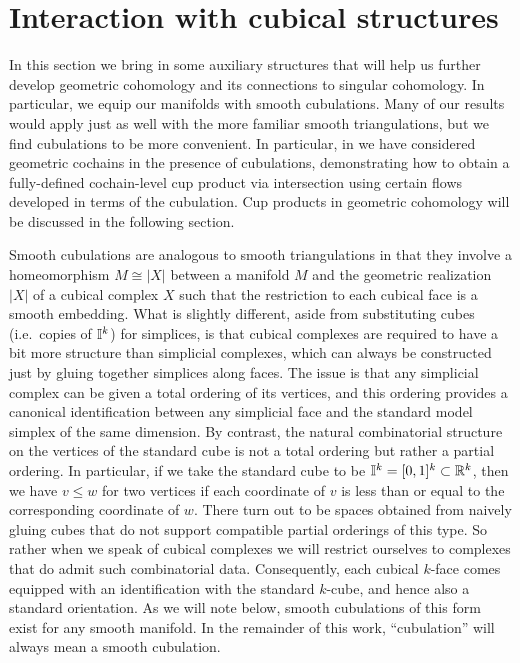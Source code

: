 







\section{Interaction with cubical structures}
\label{S: transversality}

In this section we bring in some auxiliary structures that will help us further develop geometric cohomology and its connections to singular cohomology. In particular, we equip our manifolds with smooth cubulations. Many of our results would apply just as well with the more familiar smooth triangulations, but we find cubulations to be more convenient. In particular, in \cite{FMS-flows} we have considered geometric cochains in the presence of cubulations, demonstrating how to obtain a fully-defined cochain-level cup product via intersection using certain flows developed in terms of the cubulation. Cup products in geometric cohomology will be discussed in the following section.

Smooth cubulations are analogous to smooth triangulations in that they involve a homeomorphism $M\cong |X|$ between a manifold $M$ and the geometric realization $|X|$ of a cubical complex $X$ such that the restriction to each cubical face is a smooth embedding. What is slightly different, aside from substituting cubes (i.e.\ copies of $\mathbb{I}^k$) for simplices, is that cubical complexes are required to have a bit more structure than simplicial complexes, which can always be constructed just by gluing together simplices along faces. The issue is that any simplicial complex can be given a total ordering of its vertices, and this ordering provides a canonical identification between any simplicial face and the standard model simplex of the same dimension. By contrast, the natural combinatorial structure on the vertices of the standard cube is not a total ordering but rather a partial ordering. In particular, if we take the standard cube to be $\mathbb{I}^k=[0,1]^k\subset \mathbb{R}^k$, then we have $v\leq w$ for two vertices if each coordinate of $v$ is less than or equal to the corresponding coordinate of $w$. There turn out to be spaces obtained from naively gluing cubes that do not support compatible partial orderings of this type. So rather when we speak of cubical complexes we will restrict ourselves to complexes that do admit such combinatorial data.
Consequently, each cubical $k$-face comes equipped with an identification with the standard $k$-cube, and hence also a standard orientation. As we will note below, smooth cubulations of this form exist for any smooth manifold. In the remainder of this work, ``cubulation'' will always mean a smooth cubulation.

